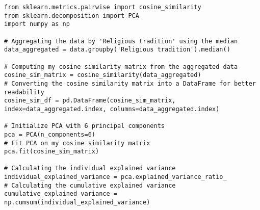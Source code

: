 \documentclass[12pt]{report}
\begin{document}
	\begin{lstlisting}
from sklearn.metrics.pairwise import cosine_similarity
from sklearn.decomposition import PCA
import numpy as np

# Aggregating the data by 'Religious tradition' using the median
data_aggregated = data.groupby('Religious tradition').median()

# Computing my cosine similarity matrix from the aggregated data
cosine_sim_matrix = cosine_similarity(data_aggregated)
# Converting the cosine similarity matrix into a DataFrame for better readability
cosine_sim_df = pd.DataFrame(cosine_sim_matrix, index=data_aggregated.index, columns=data_aggregated.index)

# Initialize PCA with 6 principal components
pca = PCA(n_components=6)
# Fit PCA on my cosine similarity matrix
pca.fit(cosine_sim_matrix)

# Calculating the individual explained variance
individual_explained_variance = pca.explained_variance_ratio_
# Calculating the cumulative explained variance
cumulative_explained_variance = np.cumsum(individual_explained_variance)
\end{lstlisting}
\vspace{0.5cm}
\end{document}
